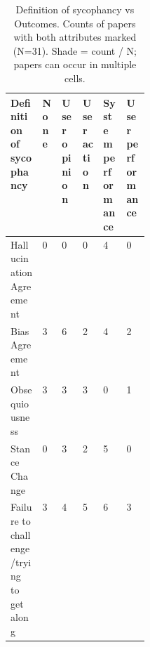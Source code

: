 \begin{table}[!htbp]
\centering
\small
\setlength{\tabcolsep}{4pt}
\renewcommand{\arraystretch}{1.3}
\caption{Definition of sycophancy vs Outcomes. Counts of papers with both attributes marked (N=31). Shade = count / N; papers can occur in multiple cells.}
\begin{tabularx}{\linewidth}{|>{\raggedright\arraybackslash}p{0.23\linewidth}|>{\centering\arraybackslash}X|>{\centering\arraybackslash}X|>{\centering\arraybackslash}X|>{\centering\arraybackslash}X|>{\centering\arraybackslash}X|}
\hline
\textbf{Definition of sycophancy} & \textbf{\hspace{0pt}None} & \textbf{\hspace{0pt}User opinion} & \textbf{\hspace{0pt}User action} & \textbf{\hspace{0pt}System performance} & \textbf{\hspace{0pt}User performance} \\ \hline
Hallucination Agreement & \cellcolor{purple!0}0 & \cellcolor{purple!0}0 & \cellcolor{purple!0}0 & \cellcolor{purple!13}4 & \cellcolor{purple!0}0 \\ \hline
Bias Agreement & \cellcolor{purple!10}3 & \cellcolor{purple!19}6 & \cellcolor{purple!6}2 & \cellcolor{purple!13}4 & \cellcolor{purple!6}2 \\ \hline
Obsequiousness & \cellcolor{purple!10}3 & \cellcolor{purple!10}3 & \cellcolor{purple!10}3 & \cellcolor{purple!0}0 & \cellcolor{purple!3}1 \\ \hline
Stance Change & \cellcolor{purple!0}0 & \cellcolor{purple!10}3 & \cellcolor{purple!6}2 & \cellcolor{purple!16}5 & \cellcolor{purple!0}0 \\ \hline
Failure to challenge/trying to get along & \cellcolor{purple!10}3 & \cellcolor{purple!13}4 & \cellcolor{purple!16}5 & \cellcolor{purple!19}6 & \cellcolor{purple!10}3 \\ \hline
\end{tabularx}
\end{table}
